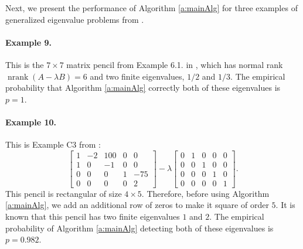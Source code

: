 \documentclass[12pt]{article}
\DeclareMathOperator{\nrank}{nrank}
\begin{document}
Next, we present the performance of Algorithm \ref{a:mainAlg} for three examples of generalized eigenvalue problems from \cite{hochstenbach2019solving}.

\paragraph{Example 9.}
This is the $7\times 7$ matrix pencil from Example 6.1. in \cite{hochstenbach2019solving}, which has normal rank $\nrank(A-\lambda B) = 6$ and two finite eigenvalues, $1/2$ and $1/3$.
The empirical probability that Algorithm \ref{a:mainAlg} correctly both of these eigenvalues is $p = 1$.
\paragraph{Example 10.}
This is Example C3 from \cite{demmel1988accurate}:
\begin{equation*}
    \begin{bmatrix}
        1 & -2 & 100 & 0 & 0\\
        1 & 0 & -1 & 0 & 0  \\
        0 & 0 & 0 & 1 & -75 \\
        0 & 0 & 0 & 0 & 2
    \end{bmatrix} - \lambda \begin{bmatrix}
        0 & 1 & 0 & 0 & 0\\
        0 & 0 & 1 & 0 & 0\\
        0 & 0 & 0 & 1 & 0\\
        0 & 0 & 0 & 0 & 1
    \end{bmatrix}.
\end{equation*}
This pencil is rectangular of size $4\times 5$. Therefore, before using Algorithm \ref{a:mainAlg}, we add an additional row of zeros to make it square of order $5$. It is known that this pencil has two finite eigenvalues $1$ and $2$. The empirical probability of Algorithm \ref{a:mainAlg} detecting both of these eigenvalues is $p = 0.982$.
\end{document}
